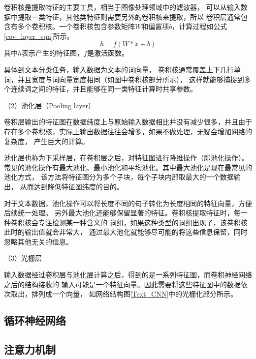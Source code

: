 卷积核是提取特征的主要工具，相当于图像处理领域中的滤波器，
可以从输入数据中提取一类特征，其他类特征则需要另外的卷积核来提取，所以
卷积层通常包含有多个卷积核。一个卷积核包含参数矩阵$W$和偏置项$b$，计算过程如公式\ref{cov_layer_eqn}所示。
\begin{equation}
    h=f\left ( W\ast x+b \right )
    \label{cov_layer_eqn}
\end{equation}
其中$h$表示产生的特征图，$f$是激活函数。

具体到文本分类任务，输入数据为文本的词向量，
卷积核通常覆盖上下几行单词，并且宽度与词向量宽度相同（如图中卷积核部分所示），
这样就能够捕捉到多个连续词之间的特征，并且能够在同一类特征计算时共享参数。

（2）池化层（Pooling layer）

卷积层输出的特征图在数据纬度上与原始输入数据相比并没有减少很多，并且由于
存在多个卷积核，实际上输出数据往往会增多，如果不做处理，无疑会增加网络的复杂度，
产生巨大的计算。

池化层也称为下采样层，在卷积层之后，对特征图进行降维操作（即池化操作）。
常见的池化操作有最大池化、最小池化和平均池化。其中最大池化是现在最常见的池化方式，
该方法将特征图分为多个子块，每个子块内部取最大的一个数据输出，
从而达到降低特征图纬度的目的。

对于文本数据，池化操作可以将长度不同的句子转化为长度相同的特征向量，方便后续统一处理。
另外最大池化还能够保留显著的特征。卷积核提取特征时，每一种卷积核会专注检测某一种含义的
词组，如果这种类型的词组出现了，该卷积核此时的输出值就会非常大，
通过最大池化就能够尽可能的将这些信息保留，同时忽略其他无关的信息。

（3）光栅层

输入数据经过卷积层与池化层计算之后，得到的是一系列特征图，而卷积神经网络之后的结构接收的
输入可能是一个特征向量。因此需要将这些特征图中的数据依次取出，排列成一个向量，
如网络结构图\ref{Text_CNN}中的光栅化部分所示。
\subsection{循环神经网络}
\subsection{注意力机制}